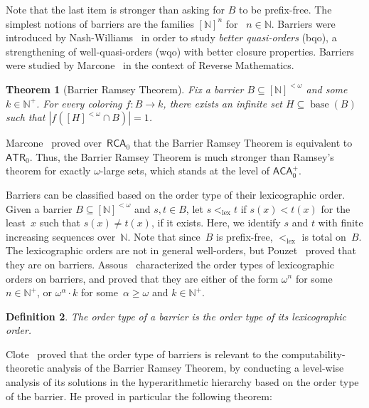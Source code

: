 \documentclass{article}
\newcommand{\RCA}[0]{\mathsf{RCA}}
\newcommand{\ACA}[0]{\mathsf{ACA}}
\newcommand{\ATR}[0]{\mathsf{ATR}}
\newcommand{\NN}[0]{\mathbb{N}}
\newcommand{\lex}{\mathrm{lex}}
\newcommand{\base}{\operatorname{base}}
\newtheorem{theorem}{Theorem}
\numberwithin{theorem}{section}
\newtheorem{definition}[theorem]{Definition}
\newcommand{\lorenzo}[1]{\textcolor{orange}{#1}}
\begin{document}
Note that the last item is stronger than asking for $B$ to be prefix-free.
The simplest notions of barriers are the families $[\NN]^n$ for ~$n \in \NN$. %
Barriers were introduced by Nash-Williams~\cite{nash-williams1968better} in order to study \emph{better quasi-orders} (bqo), a strengthening of well-quasi-orders (wqo) with better closure properties. Barriers were studied by Marcone~\cite{marcone2005wqo} in the context of Reverse Mathematics.

\begin{theorem}[Barrier Ramsey Theorem]\label{thm:bart}
Fix a barrier $B \subseteq [\NN]^{<\omega}$ and some~$k \in \NN^+$. 
For every coloring $f : B \to k$, there exists an infinite set $H \subseteq \base(B)$ such that $|f([H]^{<\omega} \cap B)| = 1$. 
\end{theorem}

Marcone~\cite{marcone2005wqo} proved over~$\RCA_0$ that the Barrier Ramsey Theorem is equivalent to~$\ATR_0$. Thus, the Barrier Ramsey Theorem is much stronger than Ramsey's theorem for exactly $\omega$-large sets, which stands at the level of $\ACA_0^+$.

Barriers can be classified based on the order type of their lexicographic order. Given a barrier $B \subseteq [\NN]^{<\omega}$ and $s, t \in B$, let $s <_\lex t$ if $s(x) < t(x)$ for the least~$x$ such that $s(x) \neq t(x)$, if it exists. Here, we identify $s$ and $t$ with finite increasing sequences over~$\NN$. Note that since~$B$ is prefix-free, $<_\lex$ is total on~$B$.
The lexicographic orders are not in general well-orders, but Pouzet~\cite{pouzet1972premeilleurordres} proved that they are on barriers. Assous~\cite{assous1974caracterisation} characterized the order types of lexicographic orders on barriers, and proved that they are either of the form $\omega^n$ for some~$n \in \NN^+$, or $\omega^\alpha \cdot k$ for some~$\alpha \geq \omega$ and $k \in \NN^+$. %

\begin{definition}
The order type of a barrier is the order type of its lexicographic order.
\end{definition}

Clote~\cite{clote1984recursion} proved that the order type of barriers is relevant to the computability-theoretic analysis of the Barrier Ramsey Theorem, by conducting a level-wise analysis of its solutions in the hyperarithmetic hierarchy based on the order type of the barrier. He proved in particular the following theorem:
\end{document}
